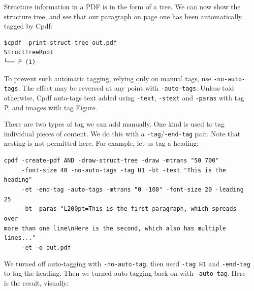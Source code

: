 \documentclass{book}
\begin{document}
\noindent Structure information in a PDF is in the form of a tree. We can now show the structure tree, and see that our paragraph on page one has been automatically tagged by Cpdf:

\begin{verbatim}
$cpdf -print-struct-tree out.pdf
StructTreeRoot
└── P (1)\end{verbatim}

\noindent To prevent such automatic tagging, relying only on manual tags, use \texttt{-no-auto-tags}. The effect may be reversed at any point with \texttt{-auto-tags}. Unless told otherwise, Cpdf auto-tags text added using \texttt{-text}, \texttt{-stext} and \texttt{-paras} with tag P, and images with tag Figure.

There are two types of tag we can add manually. One kind is used to tag individual pieces of content. We do this with a \texttt{-tag}/\texttt{-end-tag} pair. Note that nesting is not permitted here. For example, let us tag a heading:

\begin{framed}
   \noindent\small\verb!cpdf -create-pdf AND -draw-struct-tree -draw -mtrans "50 700" !\\
   \noindent\small\verb!     -font-size 40 -no-auto-tags -tag H1 -bt -text "This is the heading"!\\
   \noindent\small\verb!     -et -end-tag -auto-tags -mtrans "0 -100" -font-size 20 -leading 25!\\
   \noindent\small\verb!     -bt -paras "L200pt=This is the first paragraph, which spreads over!\\
   \noindent\small\verb!more than one line\nHere is the second, which also has multiple lines..."!\\
   \noindent\small\verb!     -et -o out.pdf!
\end{framed}

\noindent We turned off auto-tagging with \texttt{-no-auto-tag}, then used \texttt{-tag H1} and \texttt{-end-tag} to tag the heading. Then we turned auto-tagging back on with \texttt{-auto-tag}. Here is the result, visually:
\end{document}
